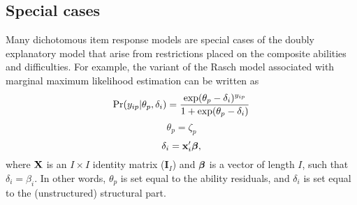 \documentclass[12pt, letterpaper]{article}
\begin{document}

%


\subsection{Special cases}
\label{sec:special-cases}

Many dichotomous item response models are special cases of the doubly explanatory model that arise from restrictions placed on the composite abilities and difficulties. For example, the variant of the Rasch model \cite{Rasch1960a} associated with marginal maximum likelihood estimation \cite{bock1981marginal} can be written as
\begin{equation}
	\Pr ( {y_{ip}} | \theta_p, \delta_i) =
	\frac {\exp(\theta_p - \delta_i)^{y_{ip}}}
	{1 + \exp(\theta_p - \delta_i)}
\end{equation}
\begin{equation}
	\theta_p = \zeta_p
\end{equation}
\begin{equation}
	\delta_i = \mathbf{x}_i' \boldsymbol{\beta}
,\end{equation}
where $\mathbf{X}$ is an $I \times I$ identity matrix ($\mathbf{I}_I$) and $\boldsymbol{\beta}$ is a vector of length $I$, such that $\delta_i = \beta_i$. In other words, $\theta_p$ is set equal to the ability residuals, and $\delta_i$ is set equal to the (unstructured) structural part.
\end{document}
